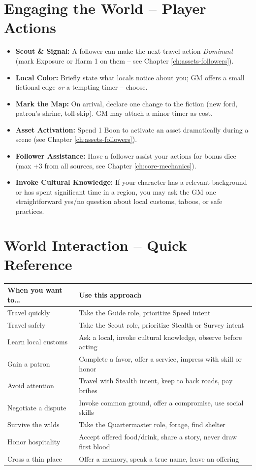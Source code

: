 \section{Engaging the World -- Player Actions}
\label{sec:player-actions-world}
\begin{itemize}
\item \textbf{Scout \& Signal:} A follower can make the next travel action \emph{Dominant} (mark Exposure or Harm 1 on them -- see Chapter \ref{ch:assets-followers}).
\item \textbf{Local Color:} Briefly state what locals notice about you; GM offers a small fictional edge \emph{or} a tempting timer -- choose.
\item \textbf{Mark the Map:} On arrival, declare one change to the fiction (new ford, patron's shrine, toll-skip). GM may attach a minor timer as cost.
\item \textbf{Asset Activation:} Spend 1 Boon to activate an asset dramatically during a scene (see Chapter \ref{ch:assets-followers}).
\item \textbf{Follower Assistance:} Have a follower assist your actions for bonus dice (max +3 from all sources, see Chapter \ref{ch:core-mechanics}).
\item \textbf{Invoke Cultural Knowledge:} If your character has a relevant background or has spent significant time in a region, you may ask the GM one straightforward yes/no question about local customs, taboos, or safe practices.
\end{itemize}

\section{World Interaction -- Quick Reference}
\label{sec:world-interaction-quickref}

\begin{center}
\begin{longtable}{ll}
\toprule
\textbf{When you want to\dots} & \textbf{Use this approach} \\
\midrule
Travel quickly & Take the Guide role, prioritize Speed intent \\
Travel safely & Take the Scout role, prioritize Stealth or Survey intent \\
Learn local customs & Ask a local, invoke cultural knowledge, observe before acting \\
Gain a patron & Complete a favor, offer a service, impress with skill or honor \\
Avoid attention & Travel with Stealth intent, keep to back roads, pay bribes \\
Negotiate a dispute & Invoke common ground, offer a compromise, use social skills \\
Survive the wilds & Take the Quartermaster role, forage, find shelter \\
Honor hospitality & Accept offered food/drink, share a story, never draw first blood \\
Cross a thin place & Offer a memory, speak a true name, leave an offering \\
\bottomrule
\end{longtable}
\end{center}

